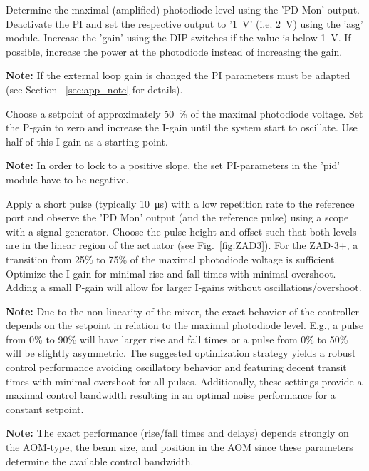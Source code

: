 \documentclass[twoside,a4paper]{refart}
\begin{document}
Determine the maximal (amplified) photodiode level using the 'PD Mon' output. Deactivate the PI and set the respective output to '\SI{1}{\volt}' (i.e. \SI{2}{\volt}) using the 'asg' module. Increase the 'gain' using the DIP switches if the value is below \SI{1}{\volt}. If possible, increase the power at the photodiode instead of increasing the gain. 

\textbf{Note:}
If the external loop gain is changed the PI parameters must be adapted (see Section ~\ref{sec:app_note} for details).

Choose a setpoint of approximately \SI{50}{\percent} of the maximal photodiode voltage. Set the P-gain to zero and increase the I-gain until the system start to oscillate. Use half of this I-gain as a starting point.

\textbf{Note:}
In order to lock to a positive slope, the set PI-parameters in the 'pid' module have to be negative.

Apply a short pulse (typically \SI{10}{\micro\second}) with a low repetition rate to the reference port and observe the 'PD Mon' output (and the reference pulse) using a scope with a signal generator. Choose the pulse height and offset such that both levels are in the linear region of the actuator (see Fig.~\ref{fig:ZAD3}). For the ZAD-3+, a transition from 25\% to 75\% of the maximal photodiode voltage is sufficient. Optimize the I-gain for minimal rise and fall times with minimal overshoot. Adding a small P-gain will allow for larger I-gains without oscillations/overshoot.

\textbf{Note:}
Due to the non-linearity of the mixer, the exact behavior of the controller depends on the setpoint in relation to the maximal photodiode level. E.g., a pulse from 0\% to 90\% will have larger rise and fall times or a pulse from 0\% to 50\% will be slightly asymmetric. The suggested optimization strategy yields a robust control performance avoiding oscillatory behavior and featuring decent transit times with minimal overshoot for all pulses. Additionally, these settings provide a maximal control bandwidth resulting in an optimal noise performance for a constant setpoint.

\textbf{Note:}
The exact performance (rise/fall times and delays) depends strongly on the AOM-type, the beam size, and position in the AOM since these parameters determine the available control bandwidth.          
\newpage
\end{document}
